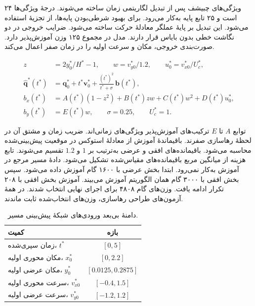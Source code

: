 ویژگی‌های چبیشف پس از تبدیل لگاریتمی زمان ساخته می‌شوند.
درجهٔ ویژگی‌ها ۲۴ است و ۲۵ تابع پایه به‌کار می‌رود.
برای بهبود شرطی‌بودن پایه‌ها، از تجزیهٔ  استفاده می‌شود.
این تبدیل بر پایهٔ عملگر معادلهٔ حرکت ساخته می‌شود.
ضرایب خروجی در دو نگاشت خطی بدون بایاس قرار دارند.
مدل در مجموع ۱۲۵ وزن آموزش‌پذیر دارد.
صورت‌بندی خروجی، مکان و سرعت اولیه را در زمان صفر اعمال می‌کند.

\begin{equation}
\begin{aligned}
z&=2y_0^*/H^*-1,\qquad
w=v_{y0}^*/1.2,\qquad u_0^*=v_{x0}^*/U_c^*,\\
\widehat{\mathbf q}^*(t^*)&=\mathbf q_0^*+t^*\mathbf v_0^*
+\frac{(t^*)^2}{t^*+\sigma}\,\mathbf b(t^*),\\
b_x(t^*)&=A(t^*)(1-z^2)+B(t^*)zw+C(t^*)w^2+D(t^*)u_0^*,\\
b_y(t^*)&=E(t^*)w,\qquad \sigma=0.25,\qquad U_c^*=1 .
\end{aligned}
\label{eq:formation-pinn-output}
\end{equation}

توابع $A$ تا $E$ ترکیب‌های آموزش‌پذیر ویژگی‌های زمانی‌اند.
ضریب زمان و مشتق آن در لحظهٔ رهاسازی صفرند.
باقیماندهٔ آموزش از معادلهٔ استوکس در موقعیت پیش‌بینی‌شده محاسبه می‌شود.
باقیمانده‌های افقی و عرضی به‌ترتیب بر $1$ و $1.2$ تقسیم می‌شوند.
تابع هزینه از میانگین مربع باقیمانده‌های مقیاس‌شده تشکیل می‌شود.
دادهٔ مسیر مرجع در آموزش به‌کار نمی‌رود.
ابتدا بخش عرضی با ۱۶۰۰ گام  آموزش داده می‌شود.
سپس بخش افقی با ۳۰۰۰ گام همان الگوریتم آموزش می‌بیند.
آموزش بخش افقی با ۲۰۸ تکرار  ادامه یافت.
وزن‌های گام ۴۸۰۸ برای اجرای نهایی انتخاب شدند.
در همهٔ آزمون‌های طراحی رهاسازی، وزن‌های انتخاب‌شده ثابت ماندند.

\begin{table}[htbp]
\centering
\caption{دامنهٔ بی‌بعد ورودی‌های شبکهٔ پیش‌بینی مسیر.}
\label{tab:formation-pinn-inputs}
\begin{tabular}{lc}
\hline
کمیت & بازه \\
\hline
زمان سپری‌شده، $t^*$ & $[0,5]$ \\
مکان محوری اولیه، $x_0^*$ & $[0,2.2]$ \\
مکان عرضی اولیه، $y_0^*$ & $[0.0125,0.2875]$ \\
سرعت محوری اولیه، $v_{x0}^*$ & $[-0.4,1.5]$ \\
سرعت عرضی اولیه، $v_{y0}^*$ & $[-1.2,1.2]$ \\
\hline
\end{tabular}
\end{table}


